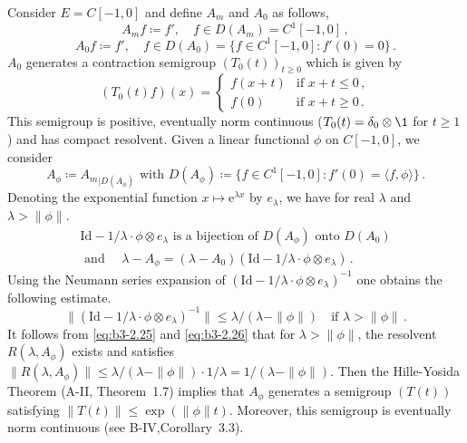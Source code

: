 \begin{example}
\begin{enumerate}[\upshape (i), wide, labelindent=.5em]
	Consider $E = C[-1,0]$ and define $A_{m}$ and $A_{0}$ as follows,
	\begin{equation}\label{eq:b3-2.23}
		A_{m}f \coloneqq f', \quad f \in D(A_{m}) = C^{1}[-1,0]\,,
	\end{equation}
	\begin{equation}\label{eq:b3-2.24}
		A_{0}f \coloneqq f', \quad f \in D(A_{0}) = \{f \in C^{1}[-1,0] \colon f'(0) = 0\}\,.
	\end{equation}
	$A_{0}$ generates a contraction semigroup $(T_{0}(t))_{t \geq 0}$ which is given by
	\begin{equation}\label{eq:b3-2.25}
		(T_{0}(t)f)(x) = \begin{cases}
			f(x+t) & \text{if } x+t \leq 0\,, \\
			f(0) & \text{if } x+t \geq 0\,.
		\end{cases}
	\end{equation}
	This semigroup is positive, eventually norm continuous ($T_{0}(t) = \delta_{0}\otimes \1$ for $t \geq 1$) and has compact resolvent.
	Given a linear functional $\phi$ on $C[-1,0]$, we consider
	\begin{equation}\label{eq:b3-2.26}
		A_{\phi} \coloneqq {A_{m}}_{|D(A_{\phi})} \text{ with } D(A_{\phi}) \coloneqq \{f \in C^{1}[-1,0] \colon f'(0) = \langle f,\phi \rangle\}\,.
	\end{equation}
	Denoting the exponential function $x \mapsto \mathrm{e}^{\lambda x}$ by $e_{\lambda}$, we have for real $\lambda$ and $\lambda > \|\phi\|$.
	 \begin{equation}\label{eq:b3-2.27}
	 \begin{aligned}
		\text{Id} - 1/\lambda \cdot \phi \otimes e_{\lambda} \text{ is a bijection of } D(A_{\phi}) \text{ onto } D(A_{0})   \\
		\text{ and }\quad \lambda - A_{\phi} = (\lambda - A_{0})(\text{Id} - 1/\lambda \cdot \phi \otimes e_{\lambda})\,.
	\end{aligned}
	\end{equation}
	Using the Neumann series expansion of $(\text{Id} - 1/\lambda \cdot \phi \otimes e_{\lambda})^{-1}$ one obtains the following estimate.
	\begin{equation}\label{eq:b3-2.28}
		\|(\text{Id} - 1/\lambda \cdot \phi \otimes e_{\lambda})^{-1}\| \leq \lambda/(\lambda - \|\phi\|) \quad \text{if } \lambda > \|\phi\|\,.
	\end{equation}
It follows from \eqref{eq:b3-2.25} and \eqref{eq:b3-2.26} that for $\lambda > \|\phi\|$, the resolvent $R(\lambda,A_{\phi})$ exists and satisfies $\|R(\lambda,A_{\phi})\| \leq \lambda/(\lambda-\|\phi\|)\cdot 1/\lambda = 1/(\lambda-\|\phi\|)$.
Then the Hille-Yosida Theorem (A-II, Theorem~1.7) implies that $A_{\phi}$ generates a semigroup $(T(t))$ satisfying $\|T(t)\| \leq \exp(\|\phi\|t)$.
Moreover, this semigroup is eventually norm continuous (see B-IV,Corollary~3.3).


\end{enumerate}
\end{example}
